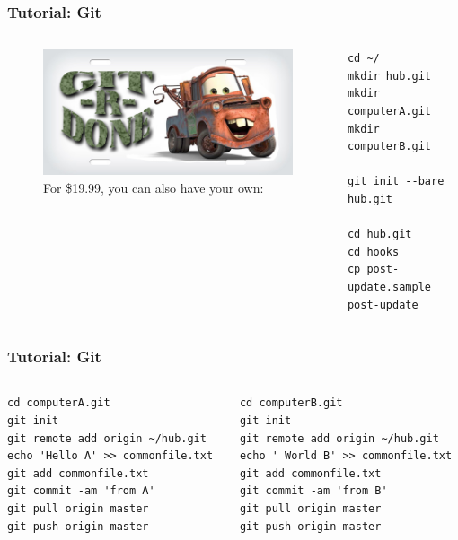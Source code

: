 \begin{frame}[fragile]
    \frametitle{Tutorial: Git}
    \begin{columns}
        \begin{column}{0.4\textwidth}
            \begin{figure}
                \caption{For \$19.99, you can also have your own:}
                \begin{center}
                    \includegraphics[width=\textwidth]{images/gitrdone.jpg}
                \end{center}
            \end{figure}
        \end{column}
        \begin{column}{0.6\textwidth}
\begin{lstlisting}
cd ~/
mkdir hub.git
mkdir computerA.git
mkdir computerB.git

git init --bare hub.git

cd hub.git
cd hooks
cp post-update.sample post-update
\end{lstlisting}
        \end{column}
    \end{columns} 
\end{frame}

\begin{frame}[fragile]
    \frametitle{Tutorial: Git}
    \begin{columns}
        \begin{column}{0.5\textwidth}
\begin{lstlisting}
cd computerA.git
git init 
git remote add origin ~/hub.git
echo 'Hello A' >> commonfile.txt
git add commonfile.txt 
git commit -am 'from A'
git pull origin master
git push origin master
\end{lstlisting}
        \end{column}
        \begin{column}{0.5\textwidth}
\begin{lstlisting}
cd computerB.git
git init 
git remote add origin ~/hub.git
echo ' World B' >> commonfile.txt
git add commonfile.txt 
git commit -am 'from B'
git pull origin master
git push origin master
\end{lstlisting}
        \end{column}
    \end{columns} 
\end{frame}


